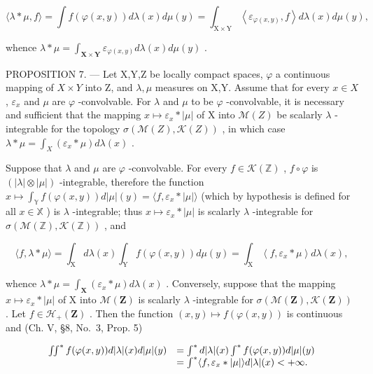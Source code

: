 \[
\langle \lambda * \mu , f \rangle = \int f (\varphi (x, y)) d \lambda (x) d \mu (y) = \int_ {\mathrm{X} \times \mathrm{Y}} \left\langle \varepsilon_ {\varphi (x, y)}, f \right\rangle d \lambda (x) d \mu (y),
\]

whence \(\lambda * \mu = \int_{\mathbf{X} \times \mathbf{Y}} \varepsilon_{\varphi(x, y)} d\lambda(x) d\mu(y)\) .

PROPOSITION 7. --- Let X,Y,Z be locally compact spaces, \(\varphi\) a continuous mapping of \(X \times Y\) into Z, and \(\lambda, \mu\) measures on X,Y. Assume that for every \(x \in X\) , \(\varepsilon_x\) and \(\mu\) are \(\varphi\) -convolvable. For \(\lambda\) and \(\mu\) to be \(\varphi\) -convolvable, it is necessary and sufficient that the mapping \(x \mapsto \varepsilon_x * |\mu|\) of X into \(\mathcal{M}(Z)\) be scalarly \(\lambda\) -integrable for the topology \(\sigma(\mathcal{M}(Z), \mathcal{K}(Z))\) , in which case \(\lambda * \mu = \int_{X} (\varepsilon_x * \mu) d\lambda(x)\) .

Suppose that \(\lambda\) and \(\mu\) are \(\varphi\) -convolvable. For every \(f \in \mathcal{K}(\mathbb{Z})\) , \(f \circ \varphi\) is \((|\lambda| \otimes |\mu|)\) -integrable, therefore the function \(x \mapsto \int_{\mathbb{Y}} f(\varphi(x, y)) d|\mu|(y) = \langle f, \varepsilon_x * |\mu| \rangle\) (which by hypothesis is defined for all \(x \in \mathbb{X}\) ) is \(\lambda\) -integrable; thus \(x \mapsto \varepsilon_x * |\mu|\) is scalarly \(\lambda\) -integrable for \(\sigma(\mathcal{M}(\mathbb{Z}), \mathcal{K}(\mathbb{Z}))\) , and

\[
\langle f, \lambda * \mu \rangle = \int_ {\mathrm{X}} d \lambda (x) \int_ {\mathrm{Y}} f (\varphi (x, y)) d \mu (y) = \int_ {\mathrm{X}} \left\langle f, \varepsilon_ {x} * \mu \right\rangle d \lambda (x),
\]

whence \(\lambda * \mu = \int_{\mathbf{X}} (\varepsilon_x * \mu) d\lambda(x)\) . Conversely, suppose that the mapping \(x \mapsto \varepsilon_x * |\mu|\) of X into \(\mathcal{M}(\mathbf{Z})\) is scalarly \(\lambda\) -integrable for \(\sigma(\mathcal{M}(\mathbf{Z}), \mathcal{K}(\mathbf{Z}))\) . Let \(f \in \mathcal{H}_+(\mathbf{Z})\) . Then the function \((x,y) \mapsto f(\varphi(x,y))\) is continuous and (Ch. V, §8, No.~3, Prop. 5)

\[
\begin{array}{r l} \iint^ {*} f (\varphi (x, y)) d | \lambda | (x) d | \mu | (y) & = \int^ {*} d | \lambda | (x) \int^ {*} f (\varphi (x, y)) d | \mu | (y) \\ & = \int^ {*} \langle f, \varepsilon_ {x} * | \mu | \rangle d | \lambda | (x) <   + \infty . \end{array}
\]

